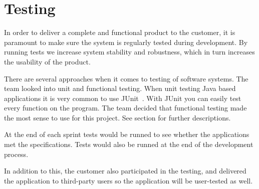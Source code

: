 \chapter{Testing}

In order to deliver a complete and functional product to the customer, it is paramount to make sure the system is regularly tested during development. 
By running tests we increase system stability and robustness, which in turn increases the usability of the product. 

There are several approaches when it comes to testing of software systems. The team looked into \gls{unit} and functional testing.  When unit testing Java based applications it is very common to use JUnit~\cite{junit}.
With JUnit you can easily test every function on the program. The team decided that functional testing made the most sense to use for this project. See section  for further descriptions.


At the end of each sprint tests would be runned to see whether the applications met the specifications. Tests would also be runned at the end of the development process. 

In addition to this, the customer also participated in the testing, and delivered the application to third-party users so the application will be user-tested as well.
\newpage

